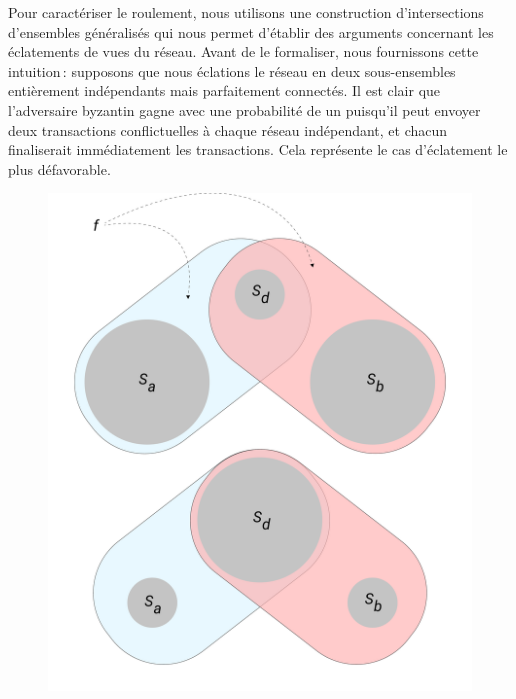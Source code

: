 \documentclass[letterpaper,twocolumn,10pt]{article}
\let\emptyset\varnothing
\theoremstyle{definition}
\begin{document}
\begin{appendices}
{%
Pour caractériser le roulement, nous utilisons une construction d'intersections d'ensembles généralisés qui nous permet d'établir des arguments concernant les éclatements de vues du réseau. Avant de le formaliser, nous fournissons cette intuition\,: supposons que nous éclations le réseau en deux sous-ensembles entièrement indépendants mais parfaitement connectés. Il est clair que l'adversaire byzantin gagne avec une probabilité de un puisqu'il peut envoyer deux transactions conflictuelles à chaque réseau indépendant, et chacun finaliserait immédiatement les transactions. Cela représente le cas d'éclatement le plus défavorable.
\begin{figure}
\centering
\includegraphics[width=0.8\linewidth]{figures/network_view.pdf}

\end{figure}}
\end{appendices}
\end{document}
